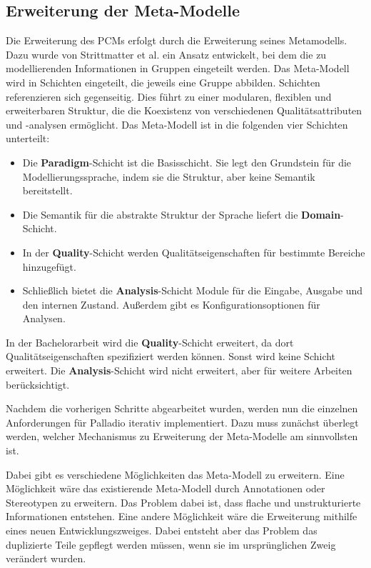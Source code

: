 \subsection{Erweiterung der Meta-Modelle}
Die Erweiterung des PCMs erfolgt durch die Erweiterung seines Metamodells. Dazu wurde von Strittmatter et al. \cite{Strittmatter} ein Ansatz entwickelt, bei dem die zu modellierenden Informationen in Gruppen eingeteilt werden. Das Meta-Modell wird in Schichten eingeteilt, die jeweils eine Gruppe abbilden. Schichten referenzieren sich gegenseitig. Dies führt zu einer modularen, flexiblen und erweiterbaren Struktur, die die Koexistenz von verschiedenen Qualitätsattributen und -analysen ermöglicht. Das Meta-Modell ist in die folgenden vier Schichten unterteilt:
\begin{itemize}
\item Die \textbf{Paradigm}-Schicht ist die Basisschicht. Sie legt den Grundstein für die Modellierungssprache, indem sie die Struktur, aber keine Semantik bereitstellt.
\item Die Semantik für die abstrakte Struktur der Sprache liefert die \textbf{Domain}-Schicht.
\item In der \textbf{Quality}-Schicht werden Qualitätseigenschaften für bestimmte Bereiche hinzugefügt.
\item Schließlich bietet die \textbf{Analysis}-Schicht Module für die Eingabe, Ausgabe und den internen Zustand. Außerdem gibt es Konfigurationsoptionen für Analysen.
\end{itemize}
In der Bachelorarbeit wird die \textbf{Quality}-Schicht erweitert, da dort Qualitätseigenschaften spezifiziert werden können. Sonst wird keine Schicht erweitert. Die \textbf{Analysis}-Schicht wird nicht erweitert, aber für weitere Arbeiten berücksichtigt.  \par
Nachdem die vorherigen Schritte abgearbeitet wurden, werden nun die einzelnen Anforderungen für Palladio iterativ implementiert. Dazu muss zunächst überlegt werden, welcher Mechanismus zu Erweiterung der Meta-Modelle am sinnvollsten ist. \par
Dabei gibt es verschiedene Möglichkeiten das Meta-Modell zu erweitern. Eine Möglichkeit wäre das existierende Meta-Modell durch Annotationen oder Stereotypen zu erweitern. Das Problem dabei ist, dass flache und unstrukturierte Informationen entstehen. Eine andere Möglichkeit wäre die Erweiterung mithilfe eines neuen Entwicklungszweiges. Dabei entsteht aber das Problem das duplizierte Teile gepflegt werden müssen, wenn sie im ursprünglichen Zweig verändert wurden. \par

